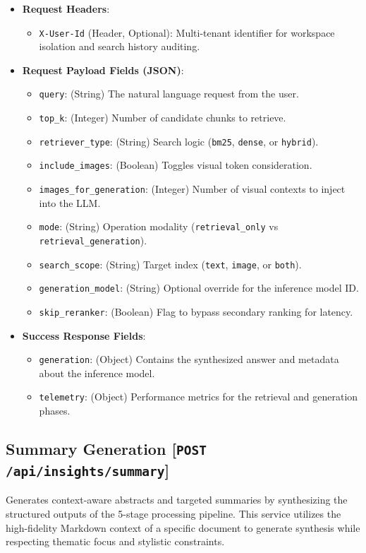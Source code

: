 \begin{itemize}
    \item \textbf{Request Headers}:
    \begin{itemize}
        \item \texttt{X-User-Id} (Header, Optional): Multi-tenant identifier for workspace isolation and search history auditing.
    \end{itemize}
    \item \textbf{Request Payload Fields (JSON)}:
    \begin{itemize}
        \item \texttt{query}: (String) The natural language request from the user.
        \item \texttt{top\_k}: (Integer) Number of candidate chunks to retrieve.
        \item \texttt{retriever\_type}: (String) Search logic (\texttt{bm25}, \texttt{dense}, or \texttt{hybrid}).
        \item \texttt{include\_images}: (Boolean) Toggles visual token consideration.
        \item \texttt{images\_for\_generation}: (Integer) Number of visual contexts to inject into the LLM.
        \item \texttt{mode}: (String) Operation modality (\texttt{retrieval\_only} vs \texttt{retrieval\_generation}).
        \item \texttt{search\_scope}: (String) Target index (\texttt{text}, \texttt{image}, or \texttt{both}).
        \item \texttt{generation\_model}: (String) Optional override for the inference model ID.
        \item \texttt{skip\_reranker}: (Boolean) Flag to bypass secondary ranking for latency.
    \end{itemize}
    \item \textbf{Success Response Fields}:
    \begin{itemize}
        \item \texttt{generation}: (Object) Contains the synthesized answer and metadata about the inference model.
        \item \texttt{telemetry}: (Object) Performance metrics for the retrieval and generation phases.
    \end{itemize}
\end{itemize}

\subsection{Summary Generation [\texttt{POST} \texttt{/api/insights/summary}]}
Generates context-aware abstracts and targeted summaries by synthesizing the structured outputs of the 5-stage processing pipeline. This service utilizes the high-fidelity Markdown context of a specific document to generate synthesis while respecting thematic focus and stylistic constraints.

